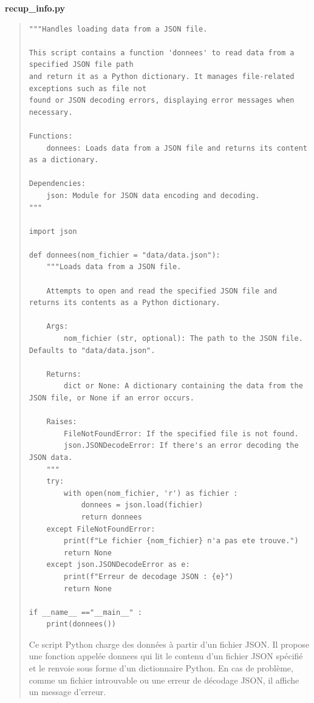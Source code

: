 \documentclass{article}
\begin{document}
\newpage
\textbf{recup\_info.py}
\vspace*{1\baselineskip}
\begin{quote}
    
\begin{tcolorbox}[colback=grisClair,colframe=black]
    \begin{lstlisting}
"""Handles loading data from a JSON file.

This script contains a function 'donnees' to read data from a specified JSON file path
and return it as a Python dictionary. It manages file-related exceptions such as file not
found or JSON decoding errors, displaying error messages when necessary.

Functions:
    donnees: Loads data from a JSON file and returns its content as a dictionary.

Dependencies:
    json: Module for JSON data encoding and decoding.
"""

import json

def donnees(nom_fichier = "data/data.json"):
    """Loads data from a JSON file.

    Attempts to open and read the specified JSON file and returns its contents as a Python dictionary.

    Args:
        nom_fichier (str, optional): The path to the JSON file. Defaults to "data/data.json".

    Returns:
        dict or None: A dictionary containing the data from the JSON file, or None if an error occurs.
    
    Raises:
        FileNotFoundError: If the specified file is not found.
        json.JSONDecodeError: If there's an error decoding the JSON data.
    """
    try:
        with open(nom_fichier, 'r') as fichier :
            donnees = json.load(fichier)
            return donnees
    except FileNotFoundError:
        print(f"Le fichier {nom_fichier} n'a pas ete trouve.")
        return None
    except json.JSONDecodeError as e:
        print(f"Erreur de decodage JSON : {e}")
        return None

if __name__ =="__main__" :
    print(donnees())
    \end{lstlisting}       
\end{tcolorbox}

\vspace*{1\baselineskip}
Ce script Python charge des données à partir d'un fichier JSON. Il propose une fonction appelée donnees qui lit le contenu d'un fichier JSON spécifié et le renvoie sous forme d'un dictionnaire Python. En cas de problème, comme un fichier introuvable ou une erreur de décodage JSON, il affiche un message d'erreur. 

\end{quote}
\end{document}
